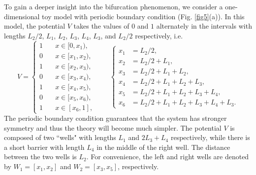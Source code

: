 \documentclass[a4paper,11pt]{article}
\begin{document}
To gain a deeper insight into the bifurcation phenomenon, we consider a one-dimensional toy model with periodic boundary condition (Fig. \ref{fig5}(a)). In this model, the potential $V$ takes the values of $0$ and $1$ alternately in the intervals with lengths $L_2/2$, $L_1$, $L_2$, $L_3$, $L_4$, $L_3$, and $ L_2/2$ respectively, i.e.
\begin{equation*}
V = \left\{
\begin{split}
1 & \quad x \in [0, x_1), \\
0 & \quad x \in [x_1, x_2), \\
1 & \quad x \in [x_2, x_3), \\
0 & \quad x \in [x_3, x_4), \\
1 & \quad x \in [x_4, x_5), \\
0 & \quad x \in [x_5, x_6), \\
1 & \quad x \in [x_6, 1],
\end{split}
\right.
\qquad
\left\{
\begin{split}
x_1 & = L_2/2, \\
x_2 & = L_2/2 + L_1, \\
x_3 & = L_2/2 + L_1 + L_2, \\
x_4 & = L_2/2 + L_1 + L_2 + L_3, \\
x_5 & = L_2/2 + L_1 + L_2 + L_3 + L_4, \\
x_6 & = L_2/2 + L_1 + L_2 + L_3 + L_4 + L_3.
\end{split}
\right.
\end{equation*}
The periodic boundary condition guarantees that the system has stronger symmetry and thus the theory will become much simpler. The potential $V$ is composed of two ``wells" with lengths $L_1$ and $2L_3+L_4$ respectively, while there is a short barrier with length $L_4$ in the middle of the right well. The distance between the two wells is $L_2$. For convenience, the left and right wells are denoted by $W_1 = [x_1, x_2]$ and $W_2 = [x_3, x_5]$, respectively.
\end{document}
